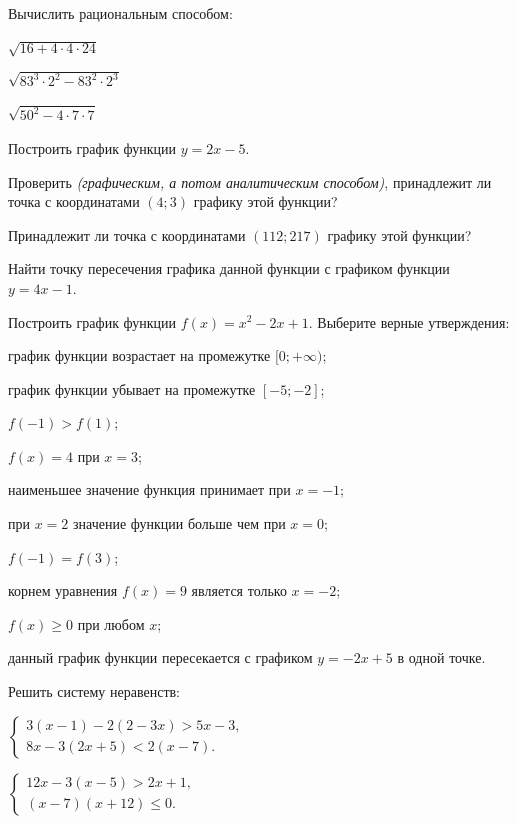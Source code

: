 %
%
%
%
\begin{class}[number=1]
	\begin{listofex}
		\item Вычислить рациональным способом:
		\begin{enumcols}[itemcolumns=3]
			\item \( \sqrt{16+4\cdot4\cdot24} \)
			\item \( \sqrt{83^3\cdot2^2-83^2\cdot2^3} \)
			\item \( \sqrt{50^2-4\cdot7\cdot7} \)
		\end{enumcols}
		\item Построить график функции \( y=2x-5 \).
		\begin{enumcols}[itemcolumns=1]
			\item Проверить \textit{(графическим, а потом аналитическим способом)}, принадлежит ли точка с координатами \( (4;3) \) графику этой функции?
			\item Принадлежит ли точка с координатами \( (112;217) \) графику этой функции?
			\item Найти точку пересечения графика данной функции с графиком функции \( y=4x-1 \).
		\end{enumcols}
		\item Построить график функции \( f(x)=x^2-2x+1 \). Выберите верные утверждения:
		\begin{enumcols}[itemcolumns=1]
			\item график функции возрастает на промежутке \( [0;+\infty) \);
			\item график функции убывает на промежутке \( [-5;-2] \);
			\item \( f(-1)>f(1) \);
			\item \( f(x)=4 \) при \( x=3 \);
			\item наименьшее значение функция принимает при \( x=-1 \);
			\item при \( x=2 \) значение функции больше чем при \( x=0 \);
			\item \( f(-1)=f(3) \);
			\item корнем уравнения \( f(x)=9 \) является только \( x=-2 \);
			\item \( f(x)\ge0 \) при любом \( x \);
			\item данный график функции пересекается с графиком \( y=-2x+5 \) в одной точке.
		\end{enumcols}
		\item Решить систему неравенств:
		\begin{enumcols}[itemcolumns=2]
			\item
			\( \left\{
			\begin{array}{l}
				3(x-1)-2(2-3x)>5x-3,\\
				8x-3(2x+5)<2(x-7).
			\end{array}
			\right. \)
			\item
			\( \left\{
			\begin{array}{l}
				12x-3(x-5)>2x+1,\\
				(x-7)(x+12)\le0.
			\end{array}
			\right. \)
		\end{enumcols}
		

\end{listofex}
\end{class}
